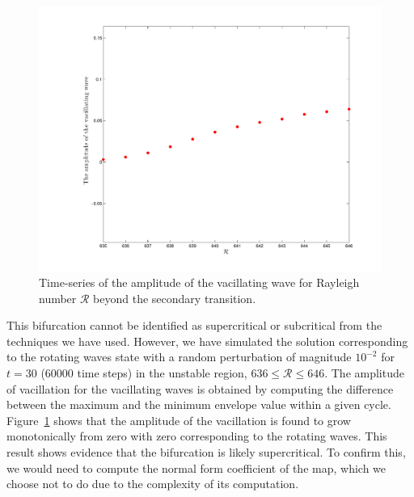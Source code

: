 \begin{figure}[t]
\centerline{\includegraphics[width = .9\textwidth]{./figures/Pictures/Amplitude_vacillating}}
\caption{Time-series of the amplitude of the vacillating wave for Rayleigh number $\mathcal{R}$ beyond the secondary transition.}
\label{amp_vac}
\end{figure}

This bifurcation cannot be identified  as supercritical or subcritical from the techniques we have used. However, we have simulated the solution corresponding to the rotating waves state with a random perturbation of magnitude $10^{-2}$
for $t = 30$ (60000 time steps) in the unstable region, $636 \le \mathcal{R} \le 646$. The amplitude of vacillation for the vacillating waves is obtained by computing the difference between the maximum and the minimum envelope value within a given cycle. Figure~\ref{amp_vac} shows that the amplitude of the vacillation is found to grow monotonically from zero with zero corresponding to the rotating waves. This result shows evidence that the bifurcation is likely supercritical. To confirm this, we would need to compute the normal form coefficient of the map, which we choose not to do due to the complexity of its computation.

